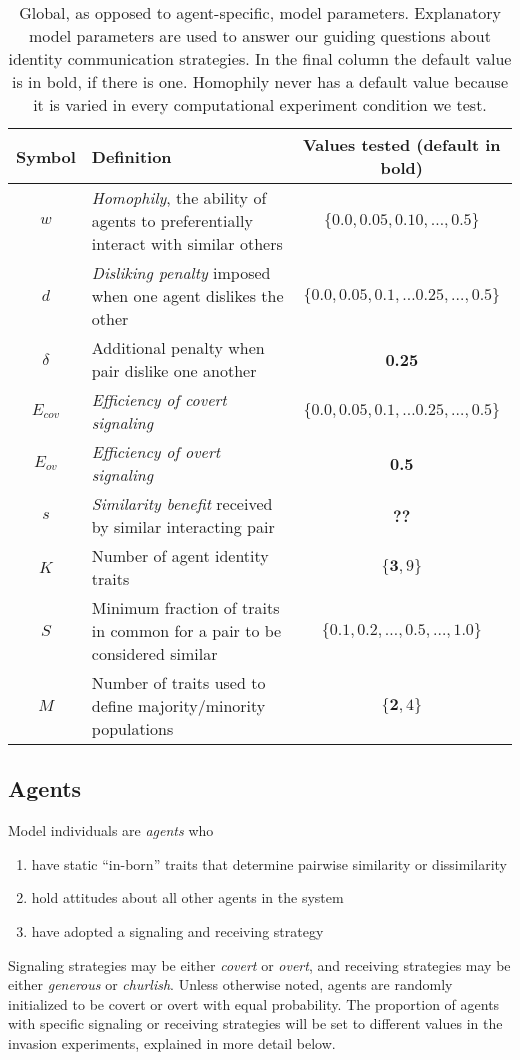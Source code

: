 \documentclass[11pt,letterpaper]{article}
\begin{document}
\vspace{1em}
\begin{table}[H]
  \centering
  \begin{tabular}{cp{3.5in}c}
    Symbol & Definition & Values tested (default in bold)  \\
    \toprule 
    $w$      & \emph{Homophily}, the ability of agents to preferentially interact with similar others & $\{0.0, 0.05, 0.10, \ldots, 0.5\}$ \\
    $d$      & \emph{Disliking penalty} imposed when one agent dislikes the other & $\{0.0, 0.05, 0.1,\ldots \mathbf{0.25}, \ldots, 0.5\}$ \\
    $\delta$ & Additional penalty when pair dislike one another & \textbf{0.25} \\
    $E_{cov}$ & \emph{Efficiency of covert signaling} & $\{0.0, 0.05, 0.1,\ldots \mathbf{0.25}, \ldots, 0.5\}$ \\
    $E_{ov}$ & \emph{Efficiency of overt signaling} & \textbf{0.5} \\
    $s$      & \emph{Similarity benefit} received by similar interacting pair & \textbf{??} \\
    $K$      & Number of agent identity traits & $\{\mathbf{3}, 9\}$ \\
    $S$      & Minimum fraction of traits in common for a pair to be considered similar & 
      $\{0.1, 0.2, \ldots, \mathbf{0.5}, \ldots, 1.0\}$\\
    $M$      & Number of traits used to define majority/minority populations & $\{\mathbf{2}, 4\}$\\
  \end{tabular}
  \caption{Global, as opposed to agent-specific, model parameters. 
  Explanatory model parameters are used to answer
  our guiding questions about identity communication strategies. In the final
  column the default value is in bold, if there is one. Homophily never has a
  default value because it is varied in every computational experiment
  condition we test.}
  \label{tab:params}
\end{table}

\subsection{Agents}

Model individuals are \emph{agents} who 
\begin{enumerate}
  \item have static ``in-born'' traits that determine pairwise similarity or dissimilarity
  \item hold attitudes about all other agents in the system
  \item have adopted a signaling and receiving strategy
\end{enumerate}
Signaling strategies
may be either \emph{covert} or \emph{overt}, and receiving strategies may be
either \emph{generous} or \emph{churlish}. Unless otherwise noted, agents are
randomly initialized to be covert or overt with equal probability. The 
proportion of agents with specific signaling or receiving strategies will be
set to different values in the invasion experiments, explained in more detail below.
\end{document}
